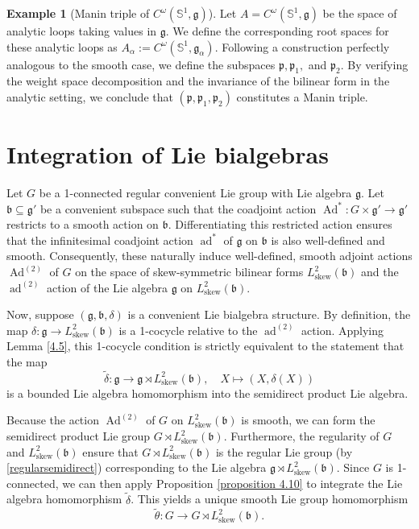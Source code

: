 \documentclass[11pt,reqno]{amsart}
\theoremstyle{definition}
\newtheorem{example}[theorem]{Example}
\numberwithin{equation}{section}
\begin{document}
\begin{example}[Manin triple of $C^{\omega}(\mathbb{S}^1, \mathfrak{g})$]
Let $A = C^{\omega}(\mathbb{S}^1, \mathfrak{g})$ be the space of analytic loops taking values in $\mathfrak{g}$. We define the corresponding root spaces for these analytic loops as $A_{\alpha} := C^{\omega}(\mathbb{S}^1, \mathfrak{g}_{\alpha})$. Following a construction perfectly analogous to the smooth case, we define the subspaces $\mathfrak{p}, \mathfrak{p}_1,$ and $\mathfrak{p}_2$. By verifying the weight space decomposition and the invariance of the bilinear form in the analytic setting, we conclude that $(\mathfrak{p}, \mathfrak{p}_1, \mathfrak{p}_2)$ constitutes a Manin triple.
\end{example}
\section{Integration of Lie bialgebras}\label{6}
Let $G$ be a 1-connected regular convenient Lie group with Lie algebra $\mathfrak{g}$. Let $\mathfrak{b} \subseteq \mathfrak{g}'$ be a convenient subspace such that the coadjoint action $\operatorname{Ad}^* : G \times \mathfrak{g}' \to \mathfrak{g}'$ restricts to a smooth action on $\mathfrak{b}$. Differentiating this restricted action ensures that the infinitesimal coadjoint action $\operatorname{ad}^*$ of $\mathfrak{g}$ on $\mathfrak{b}$ is also well-defined and smooth. Consequently, these naturally induce well-defined, smooth adjoint actions $\operatorname{Ad}^{(2)}$ of $G$ on the space of skew-symmetric bilinear forms $L^2_{\text{skew}}(\mathfrak{b})$ and the $\operatorname{ad}^{(2)}$ action of the Lie algebra $\mathfrak{g}$ on $L^2_{\text{skew}}(\mathfrak{b})$.

Now, suppose $(\mathfrak{g}, \mathfrak{b}, \delta)$ is a convenient Lie bialgebra structure. By definition, the map $\delta: \mathfrak{g} \to L^2_{\text{skew}}(\mathfrak{b})$ is a 1-cocycle relative to the $\operatorname{ad}^{(2)}$ action. Applying Lemma \ref{4.5}, this 1-cocycle condition is strictly equivalent to the statement that the map
\[
\tilde{\delta}: \mathfrak{g} \to \mathfrak{g} \rtimes L^2_{\text{skew}}(\mathfrak{b}), \quad X \mapsto (X, \delta(X))
\]
is a bounded Lie algebra homomorphism into the semidirect product Lie algebra. 

Because the action $\operatorname{Ad}^{(2)}$ of $G$ on $L^2_{\text{skew}}(\mathfrak{b})$ is smooth, we can form the semidirect product Lie group $G \rtimes L^2_{\text{skew}}(\mathfrak{b})$. Furthermore, the regularity of $G$ and $L^2_{\text{skew}}(\mathfrak{b})$ ensure that $G \rtimes L^2_{\text{skew}}(\mathfrak{b})$ is the regular Lie group (by \ref{regularsemidirect}) corresponding to the Lie algebra $\mathfrak{g} \rtimes L^2_{\text{skew}}(\mathfrak{b})$. Since $G$ is 1-connected, we can then apply Proposition \ref{proposition 4.10} to integrate the Lie algebra homomorphism $\tilde{\delta}$. This yields a unique smooth Lie group homomorphism
\[
\tilde{\theta}: G \to G \rtimes L^2_{\text{skew}}(\mathfrak{b}).
\]
\end{document}
